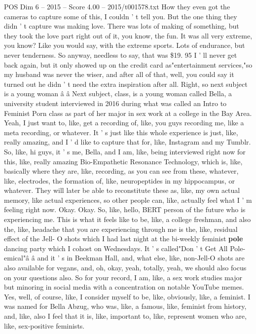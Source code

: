 \begin{textsample}{POS Dim 6 – 2015 – Score 4.00 – 2015/t001578.txt}
How they even got the cameras to capture some of this, I couldn ' t tell you.
But the one thing they didn ' t capture was making love.
There was lots of making of something, but they took the love part right out of it, you know, the fun.
It was all very extreme, you know?
Like you would say, with the extreme sports.
Lots of endurance, but never tenderness.
So anyway, needless to say, that was \$19. 95 I ' ll never get back again, but it only showed up on the credit card as"entertainment services,"so my husband was never the wiser, and after all of that, well, you could say it turned out he didn ' t need the extra inspiration after all.
Right, so next subject is a young woman â â Next subject, class, is a young woman called Bella, a university student interviewed in 2016 during what was called an Intro to Feminist Porn class as part of her major in sex work at a college in the Bay Area.
Yeah, I just want to, like, get a recording of, like, you guys recording me, like a meta recording, or whatever.
It ' s just like this whole experience is just, like, really amazing, and I ' d like to capture that for, like, Instagram and my Tumblr.
So, like, hi guys, it ' s me, Bella, and I am, like, being interviewed right now for this, like, really amazing Bio-Empathetic Resonance Technology, which is, like, basically where they are, like, recording, as you can see from these, whatever, like, electrodes, the formation of, like, neuropeptides in my hippocampus, or whatever.
They will later be able to reconstitute these as, like, my own actual memory, like actual experiences, so other people can, like, actually feel what I ' m feeling right now.
Okay.
Okay.
So, like, hello, BERT person of the future who is experiencing me.
This is what it feels like to be, like, a college freshman, and also the, like, headache that you are experiencing through me is the, like, residual effect of the Jell- O shots which I had last night at the bi-weekly feminist \textbf{pole} dancing party which I cohost on Wednesdays.
It ' s called"Don ' t Get All Pole-emical"â â and it ' s in Beekman Hall, and, what else, like, non-Jell-O shots are also available for vegans, and, oh, okay, yeah, totally, yeah, we should also focus on your questions also.
So for your record, I am, like, a sex work studies major but minoring in social media with a concentration on notable YouTube memes.
Yes, well, of course, like, I consider myself to be, like, obviously, like, a feminist.
I was named for Bella Abzug, who was, like, a famous, like, feminist from history, and, like, also I feel that it is, like, important to, like, represent women who are, like, sex-positive feminists.

\end{textsample}
